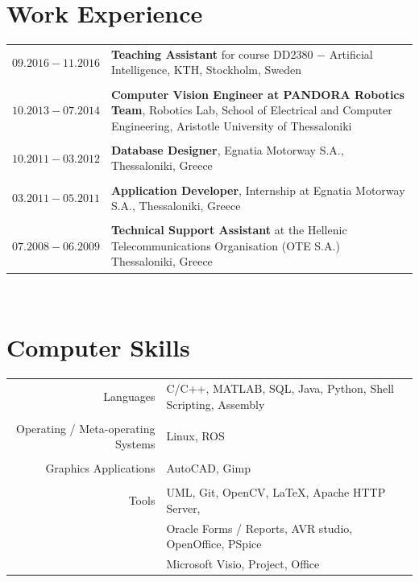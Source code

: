 \documentclass[a4paper,10pt,twoside]{article}
\begin{document}

\section{Work Experience}

\begin{tabular}{rp{12cm}}
$09.2016 - 11.2016$ & \textbf{Teaching Assistant} for course DD2380 $-$ Artificial Intelligence, KTH, Stockholm, Sweden\\
&\\
$10.2013 - 07.2014$ & \textbf{Computer Vision Engineer at PANDORA Robotics Team}, Robotics Lab,
School of Electrical and Computer Engineering, Aristotle University of Thessaloniki \\
&\\
$10.2011 - 03.2012$ & \textbf{Database Designer}, Egnatia Motorway S.A., Thessaloniki, Greece \\
&\\
$03.2011 - 05.2011$ & \textbf{Application Developer}, Internship at Egnatia Motorway S.A., Thessaloniki, Greece\\
&\\
$07.2008 - 06.2009$ & \textbf{Technical Support Assistant} at the Hellenic Telecommunications
Organisation (OTE S.A.) Thessaloniki, Greece\\
\end{tabular} \\


\section{Computer Skills}

\begin{tabular}{rp{12cm}}
Languages & C/C++, MATLAB, SQL, Java, Python, Shell Scripting, Assembly \\
&\\
Operating / Meta-operating Systems & Linux, ROS \\
&\\
Graphics Applications & AutoCAD, Gimp\\
&\\
Tools & UML, Git, OpenCV, \LaTeX, Apache HTTP Server,\\
  & Oracle Forms / Reports, AVR studio, OpenOffice, PSpice \\
  & Microsoft Visio, Project, Office\\
\end{tabular} \\
\end{document}
